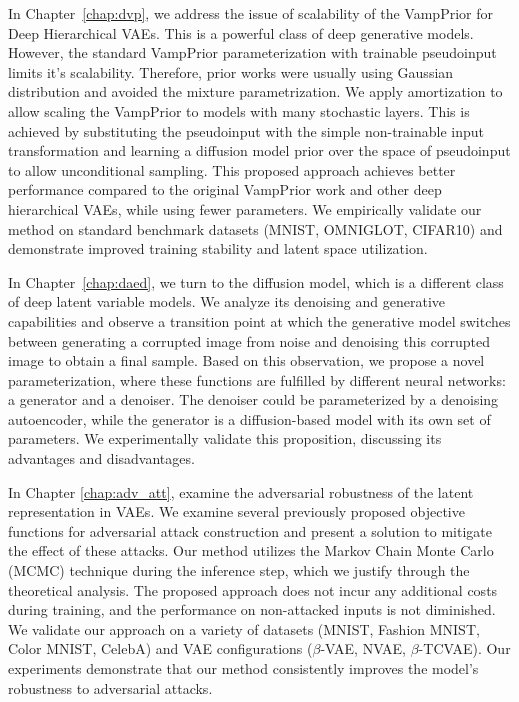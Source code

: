 In Chapter~\ref{chap:dvp}, we address the issue of scalability of the VampPrior for Deep Hierarchical VAEs. 
This is a powerful class of deep generative models.
However, the standard VampPrior parameterization with trainable pseudoinput limits it's scalability. 
Therefore, prior works were usually using Gaussian distribution and avoided the mixture parametrization.
We apply amortization to allow scaling the VampPrior to models with many stochastic layers. 
This is achieved by substituting the pseudoinput with the simple non-trainable input transformation and learning a diffusion model prior over the space of pseudoinput to allow unconditional sampling.
This proposed approach achieves better performance compared to the original VampPrior work and other deep hierarchical VAEs, while using fewer parameters. 
We empirically validate our method on standard benchmark datasets (MNIST, OMNIGLOT, CIFAR10) and demonstrate improved training stability and latent space utilization.

In Chapter~\ref{chap:daed}, we turn to the diffusion model, which is a different class of deep latent variable models. 
We analyze its denoising and generative capabilities and observe a transition point at which the generative model switches between generating a corrupted image from noise and denoising this corrupted image to obtain a final sample. 
Based on this observation, we propose a novel parameterization, where these functions are fulfilled by different neural networks: a generator and a denoiser.
The denoiser could be parameterized by a denoising autoencoder, while the generator is a diffusion-based model with its own set of parameters. 
We experimentally validate this proposition, discussing its advantages and disadvantages.


In Chapter \ref{chap:adv_att}, examine the adversarial robustness of the latent representation in VAEs.
We examine several previously proposed objective functions for adversarial attack construction and present a solution to mitigate the effect of these attacks. 
Our method utilizes the Markov Chain Monte Carlo (MCMC) technique during the inference step, which we justify through the theoretical analysis. 
The proposed approach does not incur any additional costs during training, and the performance on non-attacked inputs is not diminished. 
We validate our approach on a variety of datasets (MNIST, Fashion MNIST, Color MNIST, CelebA) and VAE configurations ($\beta$-VAE, NVAE, $\beta$-TCVAE).
Our experiments demonstrate that our method consistently improves the model's robustness to adversarial attacks.


